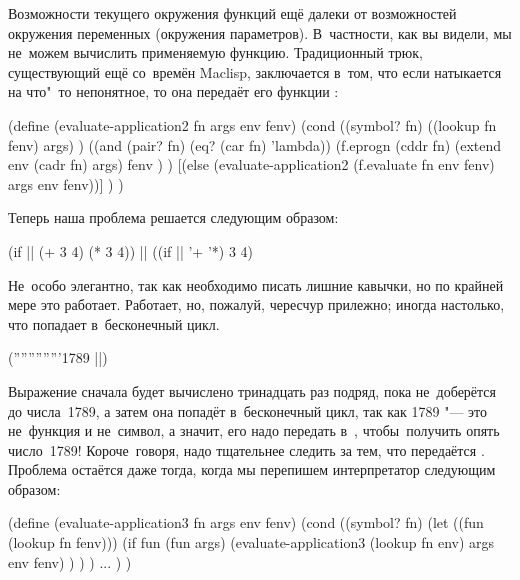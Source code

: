 Возможности текущего окружения функций ещё далеки от возможностей окружения
переменных (окружения параметров). В~частности, как вы видели, мы не~можем
вычислить применяемую функцию. Традиционный трюк, существующий ещё со~времён
Maclisp, заключается в~том, что если  натыкается на
что"~то непонятное, то она передаёт его функции :

\begin{code:lisp}
(define (evaluate-application2 fn args env fenv)
  (cond ((symbol? fn)
         ((lookup fn fenv) args) )
        ((and (pair? fn) (eq? (car fn) 'lambda))
         (f.eprogn (cddr fn)
                   (extend env (cadr fn) args)
                   fenv ) )
        [(else (evaluate-application2
               (f.evaluate fn env fenv) args env fenv))] ) )
\end{code:lisp}

Теперь наша проблема решается следующим образом:

\begin{code:lisp}
(if || (+ 3 4) (* 3 4)) |\eq| ((if || '+ '*) 3 4)
\end{code:lisp}

Не~особо элегантно, так как необходимо писать лишние кавычки, но по крайней мере
это работает. Работает, но, пожалуй, чересчур прилежно; иногда настолько, что
попадает в~бесконечный цикл.

\begin{code:lisp}
('''''''''''''1789 ||)
\end{code:lisp}

Выражение  сначала будет
вычислено тринадцать раз подряд, пока  не~доберётся до
числа~1789, а затем она попадёт в~бесконечный цикл, так как 1789 "--- это
не~функция и не~символ, а значит, его надо передать в~,
чтобы\textdots\ получить опять число~1789! Короче~говоря, надо тщательнее
следить за тем, что передаётся . Проблема остаётся даже тогда,
когда мы перепишем интерпретатор следующим образом:

\begin{code:lisp}
(define (evaluate-application3 fn args env fenv)
  (cond
    ((symbol? fn)
     (let ((fun (lookup fn fenv)))
       (if fun (fun args)
           (evaluate-application3 (lookup fn env) args env fenv) ) ) )
    ... ) )
\end{code:lisp}

